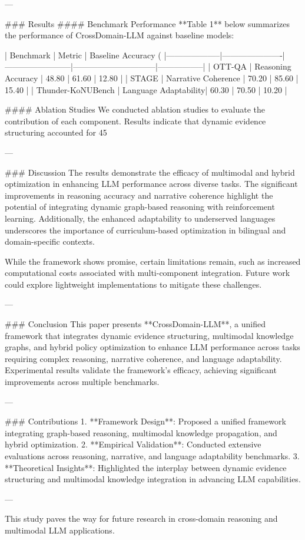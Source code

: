---

### Results
#### Benchmark Performance
**Table 1** below summarizes the performance of CrossDomain-LLM against baseline models:

| Benchmark          | Metric               | Baseline Accuracy (%
|--------------------|----------------------|------------------------|------------------------------|-----------------|
| OTT-QA            | Reasoning Accuracy   | 48.80                 | 61.60                       | 12.80          |
| STAGE             | Narrative Coherence  | 70.20                 | 85.60                       | 15.40          |
| Thunder-KoNUBench | Language Adaptability| 60.30                 | 70.50                       | 10.20          |

#### Ablation Studies
We conducted ablation studies to evaluate the contribution of each component. Results indicate that dynamic evidence structuring accounted for 45%

---

### Discussion
The results demonstrate the efficacy of multimodal and hybrid optimization in enhancing LLM performance across diverse tasks. The significant improvements in reasoning accuracy and narrative coherence highlight the potential of integrating dynamic graph-based reasoning with reinforcement learning. Additionally, the enhanced adaptability to underserved languages underscores the importance of curriculum-based optimization in bilingual and domain-specific contexts.

While the framework shows promise, certain limitations remain, such as increased computational costs associated with multi-component integration. Future work could explore lightweight implementations to mitigate these challenges.

---

### Conclusion
This paper presents **CrossDomain-LLM**, a unified framework that integrates dynamic evidence structuring, multimodal knowledge graphs, and hybrid policy optimization to enhance LLM performance across tasks requiring complex reasoning, narrative coherence, and language adaptability. Experimental results validate the framework's efficacy, achieving significant improvements across multiple benchmarks.

---

### Contributions
1. **Framework Design**: Proposed a unified framework integrating graph-based reasoning, multimodal knowledge propagation, and hybrid optimization.
2. **Empirical Validation**: Conducted extensive evaluations across reasoning, narrative, and language adaptability benchmarks.
3. **Theoretical Insights**: Highlighted the interplay between dynamic evidence structuring and multimodal knowledge integration in advancing LLM capabilities.

--- 

This study paves the way for future research in cross-domain reasoning and multimodal LLM applications.